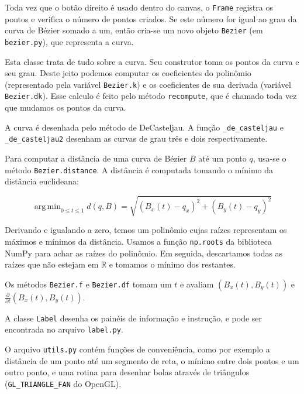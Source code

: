 \documentclass[12pt]{article}
\DeclareMathOperator*{\argmin}{arg\,min}
\theoremstyle{plain}
\numberwithin{equation}{section}
\newcommand{\ddspn}[2]{\frac{\partial#1}{\partial#2}}
\newcommand{\code}[1]{\lstinline[mathescape=true]{#1}}
\begin{document}
Toda vez que o botão direito é usado dentro do canvas, o \code{Frame} registra os pontos e verifica
o número de pontos criados. Se este número for igual ao grau da curva de Bézier somado a um, então
cria-se um novo objeto \code{Bezier} (em \code{bezier.py}), que representa a curva.

Esta classe trata de tudo sobre a curva. Seu construtor toma os pontos da curva e seu grau. Deste
jeito podemos computar os coeficientes do polinômio (representado pela variável \code{Bezier.k}) e
os coeficientes de sua derivada (variável \code{Bezier.dk}). Esse calculo é feito pelo método
\code{recompute}, que é chamado toda vez que mudamos os pontos da curva.

A curva é desenhada pelo método de DeCasteljau. A função \code{_de_casteljau} e
\code{_de_casteljau2} desenham as curvas de grau três e dois respectivamente.

Para computar a distância de uma curva de Bézier $B$ até um ponto $q$, usa-se o método
\code{Bezier.distance}. A distância é computada tomando o mínimo da distância euclideana:

\begin{equation*}
  \argmin_{0\leq t\leq 1} d(q, B) = \sqrt{\left(B_x(t)-q_x\right)^2+\left(B_y(t)-q_y\right)^2}
\end{equation*}

Derivando e igualando a zero, temos um polinômio cujas raízes representam os máximos e mínimos da
distância. Usamos a função \code{np.roots} da biblioteca NumPy para achar as raízes do polinômio.
Em seguida, descartamos todas as raízes que não estejam em $\mathbb{R}$ e tomamos o mínimo dos
restantes.

Os métodos \code{Bezier.f} e \code{Bezier.df} tomam um $t$ e avaliam $(B_x(t), B_y(t))$ e
$\ddspn{}{t}(B_x(t),B_y(t))$.

A classe \code{Label} desenha os painéis de informação e instrução, e pode ser encontrada no
arquivo \code{label.py}.

O arquivo \code{utils.py} contém funções de conveniência, como por exemplo a distância de um ponto
até um segmento de reta, o mínimo entre dois pontos e um outro ponto, e uma rotina para desenhar
bolas através de triângulos (\code{GL_TRIANGLE_FAN} do OpenGL).

\printbibliography[]
\end{document}
